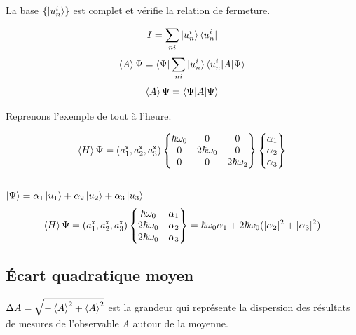\documentclass[12pt,a4paper,titlepage]{book}
\begin{document}
La base $\lbrace \ket{u_n^i} \rbrace$ est complet et vérifie la relation de fermeture.

\begin{equation*}
I = \sum\limits_{n i} \ket{u_n^i} \bra{u_n^i}
\end{equation*}
\begin{equation*}
\braket{A} \Psi = \braket{\Psi | \sum\limits_{n i} | u_n^i} \braket{u_n^i | A | \Psi}
\end{equation*}
\begin{equation*}
\braket{A} \Psi = \braket{\Psi | A | \Psi}
\end{equation*}

Reprenons l'exemple de tout à l'heure.

\begin{center}
\[
\braket{H} \Psi = (a_1^\mathsf{x}, a_2^\mathsf{x}, a_3^\mathsf{x})
\left\lbrace
\begin{matrix}
\hbar \omega_0 & 0 & 0\\
0 & 2 \hbar \omega_0 & 0\\
0 & 0 & 2 \hbar \omega_2
\end{matrix}
\right\rbrace
\left\lbrace
\begin{matrix}
\alpha_1 \\
\alpha_2 \\
\alpha_3
\end{matrix}
\right\rbrace
\]\\

$\ket\Psi = \alpha_1 \ket{u_1} + \alpha_2 \ket{u_2} + \alpha_3 \ket{u_3}$\\

\[
\braket{H} \Psi = (a_1^\mathsf{x}, a_2^\mathsf{x}, a_3^\mathsf{x})
\left\lbrace
\begin{matrix}
\hbar \omega_0 & \alpha_1 \\
2 \hbar \omega_0 & \alpha_2 \\
2 \hbar \omega_0 & \alpha_3
\end{matrix}
\right\rbrace
= \hbar \omega_0 \alpha_1 + 2 \hbar \omega_0 (\vert \alpha_2 \vert^2 + \vert \alpha_3 \vert^2)
\]
\end{center}

\subsection{Écart quadratique moyen}

$\Delta A = \sqrt{-\braket{A}^2 + \braket{A}^2}$ est la grandeur qui représente la dispersion des résultats de mesures de l'observable \textit{A} autour de la moyenne.
\end{document}
